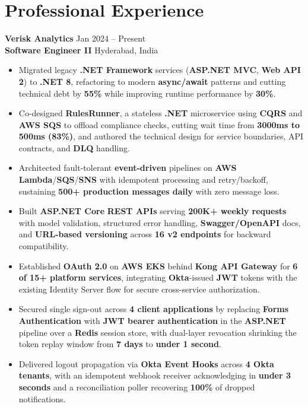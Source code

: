 \documentclass[a4paper,10pt]{article}
\begin{document}
\section*{Professional Experience}

\textbf{Verisk Analytics} \hfill Jan 2024 -- Present \\
\textbf{Software Engineer II} \hfill Hyderabad, India

\begin{itemize}[leftmargin=*]
    \item Migrated legacy \textbf{.NET Framework} services (\textbf{ASP.NET MVC}, \textbf{Web API 2}) to \textbf{.NET 8}, refactoring to modern \textbf{async/await} patterns and cutting technical debt by \textbf{55\%} while improving runtime performance by \textbf{30\%}.
    \item Co-designed \textbf{RulesRunner}, a stateless \textbf{.NET} microservice using \textbf{CQRS} and \textbf{AWS SQS} to offload compliance checks, cutting wait time from \textbf{3000ms to 500ms (83\%)}, and authored the technical design for service boundaries, API contracts, and \textbf{DLQ} handling.
    \item Architected fault-tolerant \textbf{event-driven} pipelines on \textbf{AWS Lambda}/\textbf{SQS}/\textbf{SNS} with idempotent processing and retry/backoff, sustaining \textbf{500+ production messages daily} with zero message loss.
    \item Built \textbf{ASP.NET Core} \textbf{REST APIs} serving \textbf{200K+ weekly requests} with model validation, structured error handling, \textbf{Swagger/OpenAPI} docs, and \textbf{URL-based versioning} across \textbf{16 v2 endpoints} for backward compatibility.
    \item Established \textbf{OAuth 2.0} on \textbf{AWS EKS} behind \textbf{Kong API Gateway} for \textbf{6 of 15+ platform services}, integrating \textbf{Okta}-issued \textbf{JWT} tokens with the existing Identity Server flow for secure cross-service authorization.
    \item Secured single sign-out across \textbf{4 client applications} by replacing \textbf{Forms Authentication} with \textbf{JWT bearer authentication} in the \textbf{ASP.NET} pipeline over a \textbf{Redis} session store, with dual-layer revocation shrinking the token replay window from \textbf{7 days} to \textbf{under 1 second}.
    \item Delivered logout propagation via \textbf{Okta Event Hooks} across \textbf{4 Okta tenants}, with an idempotent webhook receiver acknowledging in \textbf{under 3 seconds} and a reconciliation poller recovering \textbf{100\%} of dropped notifications.

\end{itemize}
\end{document}
